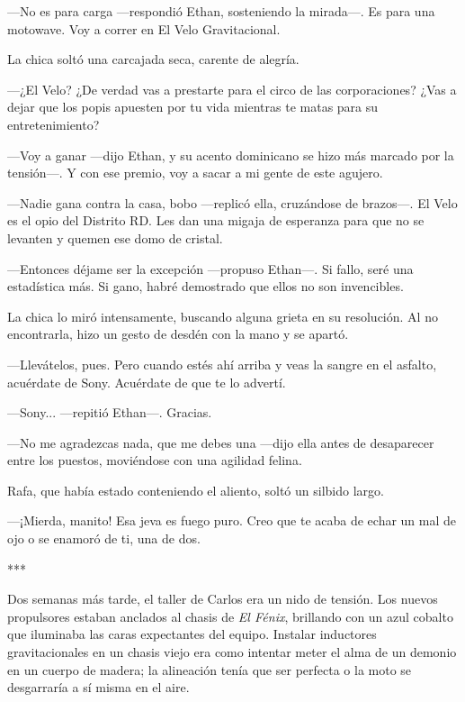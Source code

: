 \documentclass[11pt,twoside]{book}
\begin{document}
---No es para carga ---respondió Ethan, sosteniendo la mirada---. Es para una motowave. Voy a correr en El Velo Gravitacional.

La chica soltó una carcajada seca, carente de alegría.

---¿El Velo? ¿De verdad vas a prestarte para el circo de las corporaciones? ¿Vas a dejar que los popis apuesten por tu vida mientras te matas para su entretenimiento?

---Voy a ganar ---dijo Ethan, y su acento dominicano se hizo más marcado por la tensión---. Y con ese premio, voy a sacar a mi gente de este agujero.

---Nadie gana contra la casa, bobo ---replicó ella, cruzándose de brazos---. El Velo es el opio del Distrito RD. Les dan una migaja de esperanza para que no se levanten y quemen ese domo de cristal.

---Entonces déjame ser la excepción ---propuso Ethan---. Si fallo, seré una estadística más. Si gano, habré demostrado que ellos no son invencibles.

La chica lo miró intensamente, buscando alguna grieta en su resolución. Al no encontrarla, hizo un gesto de desdén con la mano y se apartó.

---Llevátelos, pues. Pero cuando estés ahí arriba y veas la sangre en el asfalto, acuérdate de Sony. Acuérdate de que te lo advertí.

---Sony... ---repitió Ethan---. Gracias.

---No me agradezcas nada, que me debes una ---dijo ella antes de desaparecer entre los puestos, moviéndose con una agilidad felina.

Rafa, que había estado conteniendo el aliento, soltó un silbido largo.

---¡Mierda, manito! Esa jeva es fuego puro. Creo que te acaba de echar un mal de ojo o se enamoró de ti, una de dos.

\bigskip
\begin{center}***\end{center}
\bigskip

Dos semanas más tarde, el taller de Carlos era un nido de tensión. Los nuevos propulsores estaban anclados al chasis de \textit{El Fénix}, brillando con un azul cobalto que iluminaba las caras expectantes del equipo. Instalar inductores gravitacionales en un chasis viejo era como intentar meter el alma de un demonio en un cuerpo de madera; la alineación tenía que ser perfecta o la moto se desgarraría a sí misma en el aire.
\end{document}
